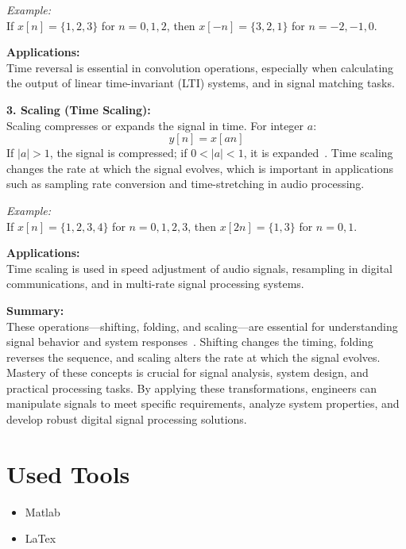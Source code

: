 \documentclass[12pt]{article}
\begin{document}
\textit{Example:} \\
If $x[n] = \{1, 2, 3\}$ for $n = 0, 1, 2$, then $x[-n] = \{3, 2, 1\}$ for $n = -2, -1, 0$.

\textbf{Applications:} \\
Time reversal is essential in convolution operations, especially when calculating the output of linear time-invariant (LTI) systems, and in signal matching tasks.

\vspace{0.5em}
\textbf{3. Scaling (Time Scaling):} \\
Scaling compresses or expands the signal in time. For integer $a$:
\begin{equation}
    y[n] = x[a n]
\end{equation}
If $|a| > 1$, the signal is compressed; if $0 < |a| < 1$, it is expanded~\cite{jervis_dsp}. Time scaling changes the rate at which the signal evolves, which is important in applications such as sampling rate conversion and time-stretching in audio processing.

\textit{Example:} \\
If $x[n] = \{1, 2, 3, 4\}$ for $n = 0, 1, 2, 3$, then $x[2n] = \{1, 3\}$ for $n = 0, 1$.

\textbf{Applications:} \\
Time scaling is used in speed adjustment of audio signals, resampling in digital communications, and in multi-rate signal processing systems.

\vspace{0.5em}
\textbf{Summary:} \\
These operations—shifting, folding, and scaling—are essential for understanding signal behavior and system responses~\cite{salivahanan_dsp, proakis_dsp, jervis_dsp}. Shifting changes the timing, folding reverses the sequence, and scaling alters the rate at which the signal evolves. Mastery of these concepts is crucial for signal analysis, system design, and practical processing tasks. By applying these transformations, engineers can manipulate signals to meet specific requirements, analyze system properties, and develop robust digital signal processing solutions.


\section*{Used Tools}
\begin{itemize}
    \item Matlab
    \item LaTex
\end{itemize}
\end{document}
